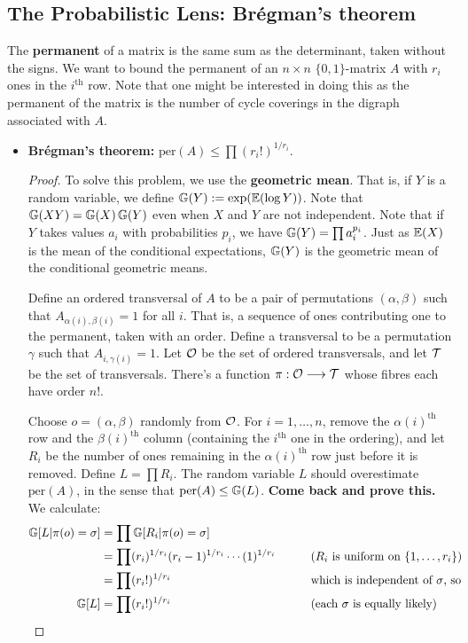 \documentclass[11pt]{article}
\newenvironment{INT}[1][]{\begin{itemize}\small\item\textbf{#1}}{\end{itemize}}
\begin{document}
\begin{chapter2}
\subsection*{The Probabilistic Lens: Br\'egman's theorem}
The \textbf{permanent} of a matrix is the same sum as the determinant, taken without the signs. We want to bound the permanent of an $n\times n$ $\{0,1\}$-matrix $A$ with $r_i$ ones in the $i^\text{th}$ row. Note that one might be interested in doing this as the permanent of the matrix is the number of cycle coverings in the digraph associated with $A$.
\begin{INT}[Br\'egman's theorem:]
$\text{per}(A)\leq \prod (r_i!)^{1/r_i}$.
\begin{proof}
To solve this problem, we use the \textbf{geometric mean}. That is, if $Y$ is a random variable, we define $\operatorname{\mathbb{G}}(Y):=\exp(\operatorname{\mathbb{E}}(\log Y))$. Note that $\operatorname{\mathbb{G}}(XY)=\operatorname{\mathbb{G}}(X)\operatorname{\mathbb{G}}(Y)$ even when $X$ and $Y$ are not independent. Note that if $Y$ takes values $a_i$ with probabilities $p_i$, we have $\operatorname{\mathbb{G}}(Y)=\prod a_i^{p_i}$. Just as $\operatorname{\mathbb{E}}(X)$ is the mean of the conditional expectations, $\operatorname{\mathbb{G}}(Y)$ is the geometric mean of the conditional geometric means.

\INDENT Define an ordered transversal of $A$ to be a pair of permutations $(\alpha,\beta)$ such that $A_{\alpha(i),\beta(i)}=1$ for all $i$. That is, a sequence of ones contributing one to the permanent, taken with an order. Define a transversal to be a permutation $\gamma$ such that $A_{i,\gamma(i)}=1$. Let $\mathcal{O}$ be the set of ordered transversals, and let $\mathcal{T}$ be the set of transversals. There's a  function $\pi:\mathcal{O}\longrightarrow\mathcal{T}$ whose fibres each have order $n!$.


\INDENT Choose $o=(\alpha,\beta)$ randomly from $\mathcal{O}$. For $i=1,\ldots, n$, remove the $\alpha(i)^\text{th}$ row and the $\beta(i)^\text{th}$ column (containing the $i^\text{th}$ one in the ordering), and let $R_i$ be the number of ones remaining in the $\alpha(i)^\text{th}$ row just before it is removed. Define $L=\prod R_i$. The random variable $L$ should overestimate $\text{per}(A)$, in the sense that $\text{per}(A)\leq\operatorname{\mathbb{G}}(L)$. \textbf{Come back and prove this.} We calculate:
\begin{alignat*}{2}
\GeomMean[L|\pi(o)=\sigma]&=\prod\GeomMean[R_i|\pi(o)=\sigma]%
\\&=\prod(r_i)^{1/r_i}(r_i-1)^{1/r_i}\cdots(1)^{1/r_i}&\qquad&\text{($R_i$ is uniform on $\{1,\ldots, r_i\}$)}
\\&=\prod(r_i!)^{1/r_i}&\qquad&\text{which is independent of $\sigma$, so}
\\\GeomMean[L]&=\prod(r_i!)^{1/r_i}&\qquad&\text{(each $\sigma$ is equally likely)}\qedhere
\end{alignat*}
\end{proof}
\end{INT}
\end{chapter2}
\end{document}
